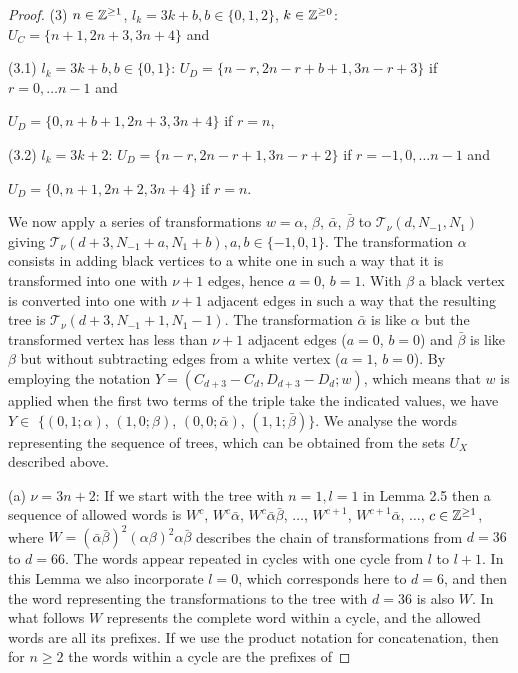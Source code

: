 \documentclass{birkjour_t2}
\theoremstyle{definition}
\theoremstyle{remark}
\numberwithin{equation}{section}
\begin{document}
\begin{proof}
   (3) $n \in {\Bbb{Z}}^{\geq 1}$, $l_{k}=3k+b, b\in \{ 0, 1, 2 \}$, $k \in {\Bbb{Z}}^{\geq 0}$: $U_{C}=\{n+1, 2n+3, 3n+4\}$ and 
 
 (3.1) $l_{k}=3k+b, b\in \{ 0, 1\}$: $U_{D}=\{n-r, 2n-r+b+1, 3n-r+3\}$ if $r = 0, \dots n -1$ and 
 
 $U_{D}=\{0, n+b+1, 2n+3, 3n+4\}$ if $r = n$,
 
 (3.2) $l_{k}=3k+2$:  $U_{D}=\{n-r, 2n-r+1, 3n-r+2\}$ if $r = -1, 0, \dots n -1$ and 
 
 $U_{D}=\{0, n+1, 2n+2, 3n+4\}$ if $r = n$.
 


    \bigskip\par 
 We now apply a series of transformations $w= \alpha$, $\beta$, $\bar{\alpha}$, $\bar{\beta}$ to $\mathcal{T}_{\nu}(d, N_{-1}, N_{1})$ giving $\mathcal{T}_{\nu}(d+3, N_{-1}+a, N_{1}+b), a,b \in \{-1,0,1\}$. The transformation $\alpha$ consists in adding black vertices to a white one in such a way that it is transformed into one with $\nu+1$ edges, hence $a=0$, $b=1$. With $\beta$ a black vertex is converted into one with $\nu+1$ adjacent edges in such a way that the resulting tree is $\mathcal{T}_{\nu}(d+3, N_{-1}+1, N_{1}-1)$. The transformation $\bar{\alpha}$ is like $\alpha$ but the transformed vertex has less than $\nu+1$ adjacent edges ($a=0$, $b=0$) and  $\bar{\beta}$ is like $\beta$ but without subtracting edges from a white vertex ($a=1$, $b=0$). By employing the notation  $Y= (C_{d+3}- C_{d}, D_{d+3}- D_{d}; w)$, which means that $w$ is applied when the first two terms of the triple take the indicated values, we have $Y \in$ $\{(0,1; \alpha)$,  $(1,0; \beta)$, $(0, 0; \bar{\alpha})$,  $(1, 1; \bar{\beta})\}$. We analyse the words representing the sequence of trees, which can be obtained from the sets $U_{X}$ described above.
 
      \bigskip\par 
 
(a) $\nu= 3n+2$: If we start with the tree with $n=1, l=1$ in Lemma 2.5 then a sequence of allowed words is $W^{c}$, $W^{c}\bar{\alpha}$, $W^{c}\bar{\alpha}\bar{\beta}$, $\dots$, $W^{c+1}$, $W^{c+1}\bar{\alpha}$, $\dots $, $c \in  {\Bbb{Z}}^{\geq 1}$, where $W=(\bar{\alpha}\bar{\beta})^{2}(\alpha\beta)^{2}\alpha\bar{\beta}$ describes the chain of transformations from $d=36$ to $d=66$. The words appear repeated in cycles with one cycle from $l$ to $l+1$. In this Lemma we also incorporate $l=0$, which corresponds here to $d=6$, and then the word representing the transformations to the tree with $d=36$ is also $W$. In what follows $W$ represents the complete word within a cycle, and the allowed words are all its prefixes. If we use the product notation for concatenation, then for $n \geq 2$  the words within a cycle are the prefixes of 


\end{proof}
\end{document}
